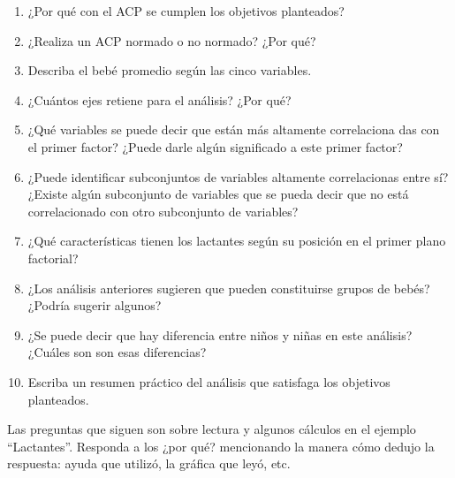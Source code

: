 \documentclass[letterpaper, 12pt]{article}
\begin{document}
\begin{enumerate}

        \item ¿Por qué con el ACP se cumplen los objetivos planteados?
        
        \item ¿Realiza un ACP normado o no normado? ¿Por qué?
        
        \item Describa el bebé promedio según las cinco variables.
        
        \item ¿Cuántos ejes retiene para el análisis? ¿Por qué?
        
        \item ¿Qué variables se puede decir que están más altamente correlaciona
        das con el primer factor? ¿Puede darle algún significado a este primer
        factor?
        
        \item ¿Puede identificar subconjuntos de variables altamente 
        correlacionas entre sí? ¿Existe algún subconjunto de variables que se
        pueda decir que no está correlacionado con otro subconjunto de variables?
        
        \item ¿Qué características tienen los lactantes según su posición en el 
        primer plano factorial?
        
        \item ¿Los análisis anteriores sugieren que pueden constituirse grupos 
        de bebés? ¿Podría sugerir algunos?
        
        \item ¿Se puede decir que hay diferencia entre niños y niñas en este 
        análisis? ¿Cuáles son son esas diferencias?
        
        \item Escriba un resumen práctico del análisis que satisfaga los
        objetivos planteados.
        
\end{enumerate}

Las preguntas que siguen son sobre lectura y algunos cálculos en el ejemplo 
``Lactantes”. Responda a los ¿por qué? mencionando la manera cómo dedujo la 
respuesta: ayuda que utilizó, la gráfica que leyó, etc.
\end{document}
